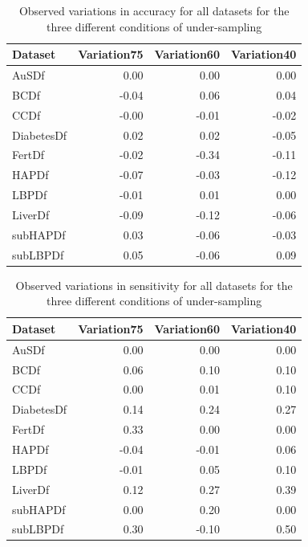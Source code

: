 \begin{table}[ht]
\centering
\begin{tabular}{lrrr}
  \hline
  \rowcolor{LightCyan}
Dataset & Variation75 & Variation60 & Variation40 \\ 
  \hline
AuSDf & 0.00 & 0.00 & 0.00 \\ 
  BCDf & -0.04 & 0.06 & 0.04 \\ 
  CCDf & -0.00 & -0.01 & -0.02 \\ 
  DiabetesDf & 0.02 & 0.02 & -0.05 \\ 
  FertDf & -0.02 & -0.34 & -0.11 \\ 
  HAPDf & -0.07 & -0.03 & -0.12 \\ 
  LBPDf & -0.01 & 0.01 & 0.00 \\ 
  LiverDf & -0.09 & -0.12 & -0.06 \\ 
  subHAPDf & 0.03 & -0.06 & -0.03 \\ 
  subLBPDf & 0.05 & -0.06 & 0.09 \\ 
   \hline
\end{tabular}
\caption{Observed variations in accuracy for all datasets for the three different conditions of under-sampling}
\end{table}

\begin{table}[ht]
\centering
\begin{tabular}{lrrr}
  \hline
   \rowcolor{LightCyan}
Dataset & Variation75 & Variation60 & Variation40 \\ 
  \hline
AuSDf & 0.00 & 0.00 & 0.00 \\ 
  BCDf & 0.06 & 0.10 & 0.10 \\ 
  CCDf & 0.00 & 0.01 & 0.10 \\ 
  DiabetesDf & 0.14 & 0.24 & 0.27 \\ 
  FertDf & 0.33 & 0.00 & 0.00 \\ 
  HAPDf & -0.04 & -0.01 & 0.06 \\ 
  LBPDf & -0.01 & 0.05 & 0.10 \\ 
  LiverDf & 0.12 & 0.27 & 0.39 \\ 
  subHAPDf & 0.00 & 0.20 & 0.00 \\ 
  subLBPDf & 0.30 & -0.10 & 0.50 \\ 
   \hline
\end{tabular}
\caption{Observed variations in sensitivity for all datasets for the three different conditions of under-sampling}
\end{table}

